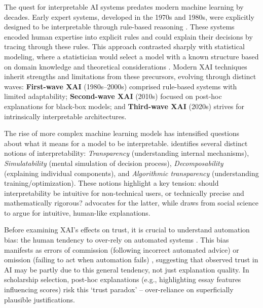 The quest for interpretable AI systems predates modern machine learning by decades. Early expert systems, developed in the 1970s and 1980s, were explicitly designed to be interpretable through rule-based reasoning \cite{shortliffe_mycin_1976}. These systems encoded human expertise into explicit rules and could explain their decisions by tracing through these rules. This approach contrasted sharply with statistical modeling, where a statistician would select a model with a known structure based on domain knowledge and theoretical considerations \cite{breiman_statistical_2001}. Modern XAI techniques inherit strengths and limitations from these precursors, evolving through distinct waves: \textbf{First-wave XAI} (1980s–2000s) comprised rule-based systems with limited adaptability; \textbf{Second-wave XAI} (2010s) focused on post-hoc explanations for black-box models; and \textbf{Third-wave XAI} (2020s) strives for intrinsically interpretable architectures.

The rise of more complex machine learning models has intensified questions about what it means for a model to be interpretable. \textcite{Lipton} identifies several distinct notions of interpretability: \emph{Transparency} (understanding internal mechanisms), \emph{Simulatability} (mental simulation of decision process), \emph{Decomposability} (explaining individual components), and \emph{Algorithmic transparency} (understanding training/optimization). These notions highlight a key tension: should interpretability be intuitive for non-technical users, or technically precise and mathematically rigorous? \textcite{rudin_stop_2019} advocates for the latter, while \textcite{miller_explanation_2017} draws from social science to argue for intuitive, human-like explanations.

Before examining XAI's effects on trust, it is crucial to understand automation bias: the human tendency to over-rely on automated systems \cite{mosier_automation_1996, parasuraman_automation_2000, skitka_automation_1999}. This bias manifests as errors of commission (following incorrect automated advice) or omission (failing to act when automation fails) \cite{mosier_automation_1996}, suggesting that observed trust in AI may be partly due to this general tendency, not just explanation quality. In scholarship selection, post-hoc explanations (e.g., highlighting essay features influencing scores) risk this `trust paradox' – over-reliance on superficially plausible justifications.

